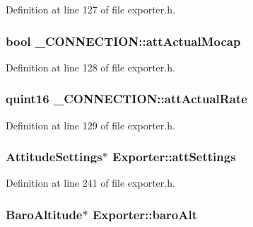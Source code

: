 Definition at line 127 of file exporter.\-h.

\hypertarget{group___mo_cap_plugin_gacd70b3a85672be0f8311fc107768c93f}{
\subsubsection[{att\-Actual\-Mocap}]{\setlength{\rightskip}{0pt plus 5cm}bool \-\_\-\-C\-O\-N\-N\-E\-C\-T\-I\-O\-N\-::att\-Actual\-Mocap}}\label{group___mo_cap_plugin_gacd70b3a85672be0f8311fc107768c93f}


Definition at line 128 of file exporter.\-h.

\hypertarget{group___mo_cap_plugin_ga14fb71ed2eb43b817ee157f6cdcb84eb}{
\subsubsection[{att\-Actual\-Rate}]{\setlength{\rightskip}{0pt plus 5cm}quint16 \-\_\-\-C\-O\-N\-N\-E\-C\-T\-I\-O\-N\-::att\-Actual\-Rate}}\label{group___mo_cap_plugin_ga14fb71ed2eb43b817ee157f6cdcb84eb}


Definition at line 129 of file exporter.\-h.

\hypertarget{group___mo_cap_plugin_gaa7be67cf3fe5bd561bfd56b81ace46d6}{
\subsubsection[{att\-Settings}]{\setlength{\rightskip}{0pt plus 5cm}Attitude\-Settings$\ast$ Exporter\-::att\-Settings\hspace{0.3cm}{\ttfamily [protected]}}}\label{group___mo_cap_plugin_gaa7be67cf3fe5bd561bfd56b81ace46d6}


Definition at line 241 of file exporter.\-h.

\hypertarget{group___mo_cap_plugin_ga15711fcb53727148f4c62b5bfa1ce9f1}{
\subsubsection[{baro\-Alt}]{\setlength{\rightskip}{0pt plus 5cm}Baro\-Altitude$\ast$ Exporter\-::baro\-Alt\hspace{0.3cm}{\ttfamily [protected]}}}\label{group___mo_cap_plugin_ga15711fcb53727148f4c62b5bfa1ce9f1}



